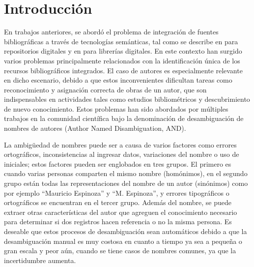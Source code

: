 \documentclass[conference]{IEEEtran}
\begin{document}
\section{Introducción}
\label{sec:introduccion}
En trabajos anteriores, se abordó el problema de integración de fuentes bibliográficas a través de tecnologías semánticas, tal como se describe en \cite{segarra2016integration} para repositorios digitales y en \cite{SUMBA2016149} para librerías digitales. En este contexto han surgido varios problemas principalmente relacionados con la identificación única de los recursos bibliográficos integrados. El caso de autores es especialmente relevante en dicho escenario, debido a que estos inconvenientes dificultan tareas como reconocimiento y asignación correcta de obras de un autor, que son indispensables en actividades tales como estudios bibliométricos y descubrimiento de nuevo conocimiento. Estos problemas han sido abordados por múltiples trabajos en la comunidad científica bajo la  denominación de desambiguación de nombres de autores (Author Named Disambiguation, AND).


La ambigüedad de nombres puede ser a causa de varios factores como errores ortográficos, inconsistencias al ingresar datos, variaciones del nombre o uso de iniciales; estos factores pueden ser englobados en tres grupos. El primero es cuando varias personas comparten el mismo nombre (homónimos), en el segundo grupo están todas las representaciones del nombre de un autor (sinónimos) como por ejemplo ``Mauricio Espinoza'' y ``M. Espinoza'', y errores tipográficos o ortográficos se encuentran en el tercer grupo. Además del nombre, se puede extraer  otras características del autor que agreguen el conocimiento necesario para determinar si dos registros hacen referencia o no la misma persona. Es deseable que estos procesos de desambiguación sean automáticos debido a que la desambiguación manual es muy costosa en cuanto a tiempo ya sea a pequeña o gran escala y  peor aún, cuando se tiene casos de nombres comunes, ya que la incertidumbre aumenta. 
\end{document}
